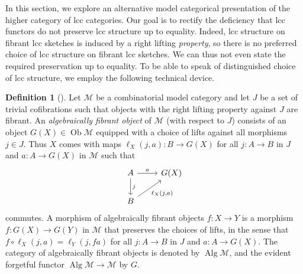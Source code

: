\documentclass[a4paper]{article}
\theoremstyle{remark}
\theoremstyle{definition}
\newtheorem{definition}[theorem]{Definition}
\begin{document}
In this section, we explore an alternative model categorical presentation of the higher category of lcc categories.
Our goal is to rectify the deficiency that lcc functors do not preserve lcc structure up to equality.
Indeed, lcc structure on fibrant lcc sketches is induced by a right lifting \emph{property}, so there is no preferred choice of lcc structure on fibrant lcc sketches. 
We can thus not even state the required preservation up to equality.
To be able to speak of distinguished choice of lcc structure, we employ the following technical device.
\begin{definition}[\cite{algebraic-models}]
  \label{def:algebraically-fibrant-objects}
  Let $\mathcal{M}$ be a combinatorial model category and let $J$ be a set of trivial cofibrations such that objects with the right lifting property against $J$ are fibrant.
  An \emph{algebraically fibrant object} of $\mathcal{M}$ (with respect to $J$) consists of an object $G(X) \in \operatorname{Ob} \mathcal{M}$ equipped with a choice of lifts against all morphisms $j \in J$.
  Thus $X$ comes with maps $\ell_X({j, a}) : B \rightarrow G(X)$ for all $j : A \rightarrow B$ in $J$ and $a : A \rightarrow G(X)$ in $\mathcal{M}$ such that
  \begin{equation}
    \begin{tikzcd}
      A \arrow[d, "j"] \arrow[r, "a"] & G(X) \\
      B \arrow[ur, "{\ell_X(j, a)}"']
    \end{tikzcd}
  \end{equation}
  commutes.
  A morphism of algebraically fibrant objects $f : X \rightarrow Y$ is a morphism $f : G(X) \rightarrow G(Y)$ in $\mathcal{M}$ that preserves the choices of lifts, in the sense that $f \circ \ell_X(j, a) = \ell_Y(j, fa)$ for all $j : A \rightarrow B$ in $J$ and $a : A \rightarrow G(X)$.
  The category of algebraically fibrant objects is denoted by $\operatorname{Alg} \mathcal{M}$, and the evident forgetful functor $\operatorname{Alg} \mathcal{M} \rightarrow \mathcal{M}$ by $G$.
\end{definition}
\end{document}
